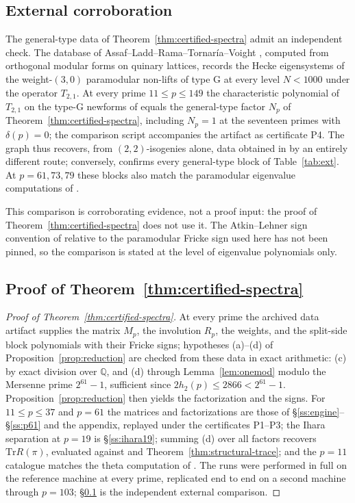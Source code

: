 \documentclass[10pt,a4paper]{amsart}
\newcommand{\Q}{\mathbb{Q}}
\newcommand{\Tr}{\mathrm{Tr}}
\begin{document}
	\subsection{External corroboration}
	\label{ss:external}
	
	The general-type data of Theorem~\ref{thm:certified-spectra} admit an
	independent check. The database of
	Assaf--Ladd--Rama--Tornar\'ia--Voight \cite{ALRTV}, computed from
	orthogonal modular forms on quinary lattices, records the Hecke
	eigensystems of the weight-$(3,0)$ paramodular non-lifts of type G at
	every level $N<1000$ under the operator $T_{2,1}$. At every prime
	$11\le p\le149$ the characteristic polynomial of $T_{2,1}$ on the type-G
	newforms of \cite{ALRTV} equals the general-type factor $N_p$ of
	Theorem~\ref{thm:certified-spectra}, including $N_p=1$ at the seventeen
	primes with $\delta(p)=0$; the comparison script accompanies the artifact
	as certificate P4. The graph thus recovers, from $(2,2)$-isogenies alone,
	data obtained in \cite{ALRTV} by an entirely different route; conversely,
	\cite{ALRTV} confirms every general-type block of Table~\ref{tab:ext}. At
	$p=61,73,79$ these blocks also match the paramodular eigenvalue
	computations of \cite{PSY2024}.
	
	This comparison is corroborating evidence, not a proof input: the proof of
	Theorem~\ref{thm:certified-spectra} does not use it. The Atkin--Lehner
	sign convention of \cite{ALRTV} relative to the paramodular Fricke sign
	used here has not been pinned, so the comparison is stated at the level of
	eigenvalue polynomials only.
	
	\subsection{Proof of Theorem~\ref{thm:certified-spectra}}
	\label{ss:proof-certified}
	
	\begin{proof}[Proof of Theorem~\ref{thm:certified-spectra}]
		At every prime the archived data artifact supplies the matrix $M_p$, the
		involution $R_p$, the weights, and the split-side block polynomials with
		their Fricke signs; hypotheses \textup{(a)}--\textup{(d)} of
		Proposition~\ref{prop:reduction} are checked from these data in exact
		arithmetic: \textup{(c)} by exact division over $\Q$, and
		\textup{(d)} through Lemma~\ref{lem:onemod} modulo the Mersenne prime
		$2^{61}-1$, sufficient since $2h_2(p)\le2866<2^{61}-1$.
		Proposition~\ref{prop:reduction} then yields the factorization and the
		signs. For $11\le p\le37$ and $p=61$ the matrices and factorizations are
		those of \S\ref{ss:engine}--\S\ref{ss:p61} and the appendix, replayed
		under the certificates P1--P3; the Ihara separation at $p=19$ is
		\S\ref{ss:ihara19}; summing \textup{(d)} over all factors recovers
		$\Tr R(\pi)$, evaluated against \cite[Thm.~2]{IbukiyamaKatsura} and
		Theorem~\ref{thm:structural-trace}; and the $p=11$ catalogue matches the
		theta computation of \cite[\S4]{Ibukiyama2018conj}. The runs were
		performed in full on the reference machine at every prime, replicated end
		to end on a second machine through $p=103$; \S\ref{ss:external} is the
		independent external comparison.
	\end{proof}
	
\end{document}

